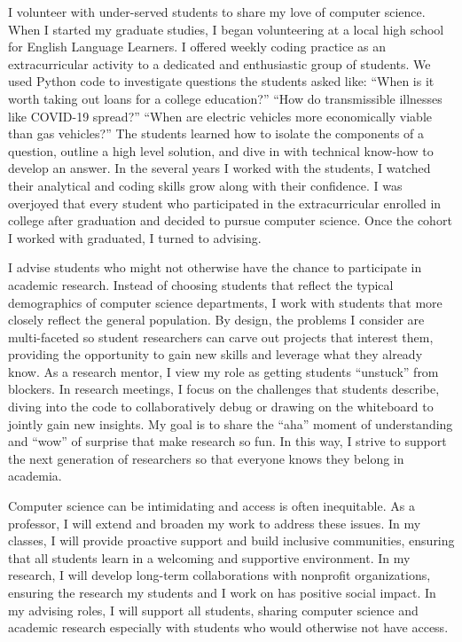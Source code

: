 \documentclass[11pt]{article}
\begin{document}
{I volunteer with under-served students to share my love of computer science. When I started my graduate studies, I began volunteering at a local high school for English Language Learners. I offered weekly coding practice as an extracurricular activity to a dedicated and enthusiastic group of students. We used Python code to investigate questions the students asked like: ``When is it worth taking out loans for a college education?'' ``How do transmissible illnesses like COVID-19 spread?'' ``When are electric vehicles more economically viable than gas vehicles?'' The students learned how to isolate the components of a question, outline a high level solution, and dive in with technical know-how to develop an answer. In the several years I worked with the students, I watched their analytical and coding skills grow along with their confidence. I was overjoyed that every student who participated in the extracurricular enrolled in college after graduation and decided to pursue computer science. Once the cohort I worked with graduated, I turned to advising.

I advise students who might not otherwise have the chance to participate in academic research. Instead of choosing students that reflect the typical demographics of computer science departments, I work with students that more closely reflect the general population. By design, the problems I consider are multi-faceted so student researchers can carve out projects that interest them, providing the opportunity to gain new skills and leverage what they already know. As a research mentor, I view my role as getting students “unstuck” from blockers. In research meetings, I focus on the challenges that students describe, diving into the code to collaboratively debug or drawing on the whiteboard to jointly gain new insights. My goal is to share the “aha” moment of understanding and “wow” of surprise that make research so fun. In this way, I strive to support the next generation of researchers so that everyone knows they belong in academia.

Computer science can be intimidating and access is often inequitable. As a professor, I will extend and broaden my work to address these issues. In my classes, I will provide proactive support and build inclusive communities, ensuring that all students learn in a welcoming and supportive environment. In my research, I will develop long-term collaborations with nonprofit organizations, ensuring the research my students and I work on has positive social impact. In my advising roles, I will support all students, sharing computer science and academic research especially with students who would otherwise not have access.
}



\end{document}
